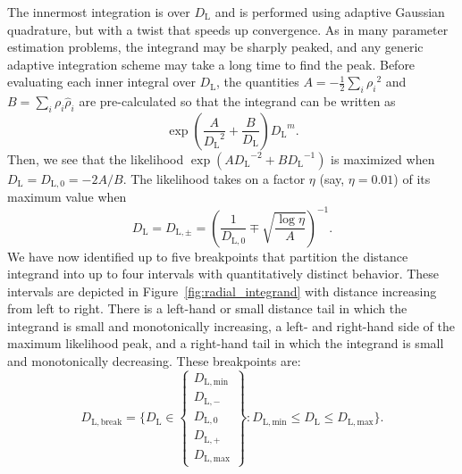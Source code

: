 \documentclass{iopart}
\begin{document}
The innermost integration is over $D_\mathrm{L}$ and is performed using adaptive Gaussian quadrature, but with a twist that speeds up convergence. As in many parameter estimation problems, the integrand may be sharply peaked, and any generic adaptive integration scheme may take a long time to find the peak. Before evaluating each inner integral over $D_\mathrm{L}$, the quantities $A=-\frac{1}{2} \sum_i {\rho_i}^2$ and $B=\sum_i \rho_i \hat\rho_i$ are pre\nobreakdashes-calculated so that the integrand can be written as
%
\begin{equation*}
	\exp\left(\frac{A}{{D_\mathrm{L}}^2} + \frac{B}{D_\mathrm{L}}\right) {D_\mathrm{L}}^m.
\end{equation*}
%
Then, we see that the likelihood $\exp(A {D_\mathrm{L}}^{-2} + B {D_\mathrm{L}}^{-1})$ is maximized when $D_\mathrm{L} = D_{\mathrm{L},0} = -2A/B$. The likelihood takes on a factor $\eta$ (say, $\eta=0.01$) of its maximum value when
%
\begin{equation}
	D_\mathrm{L} = D_{\mathrm{L},\pm} = \left(\frac{1}{D_{\mathrm{L},0}} \mp \sqrt{\frac{\log\eta}{A}}\right)^{-1}.
\end{equation}
%
We have now identified up to five breakpoints that partition the distance integrand into up to four intervals with quantitatively distinct behavior. These intervals are depicted in Figure~\ref{fig:radial_integrand} with distance increasing from left to right. There is a left\nobreakdashes-hand or small distance tail in which the integrand is small and monotonically increasing, a left\nobreakdashes- and right\nobreakdashes-hand side of the maximum likelihood peak, and a right\nobreakdashes-hand tail in which the integrand is small and monotonically decreasing. These breakpoints are:
%
\begin{equation}
    D_{\mathrm{L},\mathrm{break}} = \{ D_\mathrm{L} \in
    \left\{
    \begin{array}{c}
    D_{\mathrm{L},\mathrm{min}} \\
    D_{\mathrm{L},-} \\
    D_{\mathrm{L},0} \\
    D_{\mathrm{L},+} \\
    D_{\mathrm{L},\mathrm{max}}
    \end{array}
    \right\} :
    D_{\mathrm{L},\mathrm{min}} \leq D_\mathrm{L}
    \leq D_{\mathrm{L},\mathrm{max}}\}.
\end{equation}
%
\end{document}
